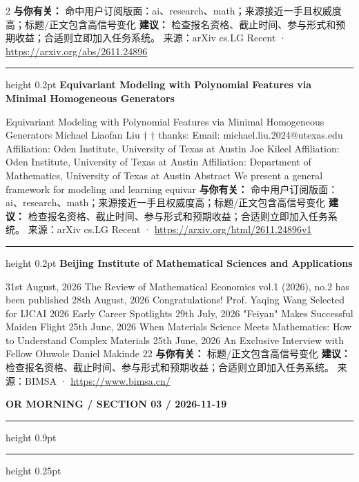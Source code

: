 \documentclass[10.5pt]{ctexart}
\begin{document}
\begin{multicols}{2}
\textbf{与你有关：} 命中用户订阅版面：ai、research、math；来源接近一手且权威度高；标题/正文包含高信号变化
\textbf{建议：} 检查报名资格、截止时间、参与形式和预期收益；合适则立即加入任务系统。
{\footnotesize\color{ormuted} 来源：arXiv cs.LG Recent · \url{https://arxiv.org/abs/2611.24896}}
\vspace{2mm}
\hrule height 0.2pt
\vspace{2mm}
{\large\bfseries Equivariant Modeling with Polynomial Features via Minimal Homogeneous Generators}\par
Equivariant Modeling with Polynomial Features via Minimal Homogeneous Generators Michael Liaofan Liu † † thanks: Email: michael.liu.2024@utexas.edu Affiliation: Oden Institute, University of Texas at Austin Joe Kileel Affiliation: Oden Institute, University of Texas at Austin Affiliation: Department of Mathematics, University of Texas at Austin Abstract We present a general framework for modeling and learning equivar
\textbf{与你有关：} 命中用户订阅版面：ai、research、math；来源接近一手且权威度高；标题/正文包含高信号变化
\textbf{建议：} 检查报名资格、截止时间、参与形式和预期收益；合适则立即加入任务系统。
{\footnotesize\color{ormuted} 来源：arXiv cs.LG Recent · \url{https://arxiv.org/html/2611.24896v1}}
\vspace{2mm}
\hrule height 0.2pt
\vspace{2mm}
{\large\bfseries Beijing Institute of Mathematical Sciences and Applications}\par
31st August, 2026 The Review of Mathematical Economics vol.1 (2026), no.2 has been published 28th August, 2026 Congratulations! Prof. Yaqing Wang Selected for IJCAI 2026 Early Career Spotlights 29th July, 2026 "Feiyan" Makes Successful Maiden Flight 25th June, 2026 When Materials Science Meets Mathematics: How to Understand Complex Materials 25th June, 2026 An Exclusive Interview with Fellow Oluwole Daniel Makinde 22
\textbf{与你有关：} 标题/正文包含高信号变化
\textbf{建议：} 检查报名资格、截止时间、参与形式和预期收益；合适则立即加入任务系统。
{\footnotesize\color{ormuted} 来源：BIMSA · \url{https://www.bimsa.cn/}}
\end{multicols}
\newpage
{\small\bfseries OR MORNING / SECTION 03 / 2026-11-19}
\vspace{2mm}
\hrule height 0.9pt
\vspace{1.5mm}
\hrule height 0.25pt
\vspace{4mm}
\end{document}

